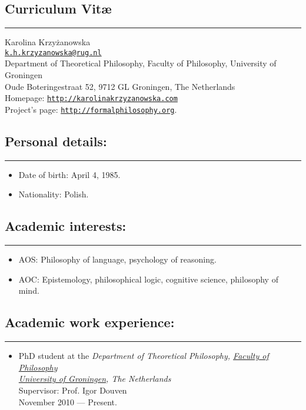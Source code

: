 \documentclass[a4paper,12pt]{article}
\begin{document}
\newcommand{\headone}[1] {
 \section*{#1}
\rule[2.5ex]{\textwidth}{2pt}}

\newcommand{\headtwo}[1]{
  \subsection*{#1}
  \rule[1.5ex]{\textwidth}{.5pt}}

\newcommand{\headthree}[1]{ {\large #1}}

\newcommand{\link}[1]{ \texttt{\href{#1}{#1}}}

\begin{small}

  \headone{Curriculum Vit\ae}
  
  Karolina Krzyżanowska\\
  \href{mailto:k.h.krzyzanowska@rug.nl}{\texttt{k.h.krzyzanowska@rug.nl}}\\
  Department of Theoretical Philosophy, Faculty of Philosophy, University of Groningen\\
  Oude Boteringestraat 52, 9712 GL Groningen, The Netherlands\\
  Homepage: \href{http://karolinakrzyzanowska.com}{\texttt{http://karolinakrzyzanowska.com}}\\
  Project's page:
  \href{http://formalphilosophy.org}{\texttt{http://formalphilosophy.org}}.

  \headtwo{Personal details:}
  \begin{itemize}
  \item Date of birth: April 4, 1985.
  \item Nationality: Polish.
  \end{itemize}

  
  \headtwo{Academic interests:}
  \begin{itemize}
  \item AOS: Philosophy of language, psychology of reasoning.
  \item AOC: Epistemology, philosophical logic, cognitive science,
    philosophy of mind.
  \end{itemize}
  
  \headtwo{Academic work experience:}
  \begin{itemize}
  \item PhD student at
    the %
    \emph{Department of Theoretical Philosophy, \href{http://www.rug.nl/filosofie/}{Faculty of Philosophy}\\
      \href{http://www.rug.nl}{University of Groningen}, The Netherlands}\\
    Supervisor: Prof. Igor Douven\\
    November 2010 --- Present.



\end{itemize}
\end{small}
\end{document}
